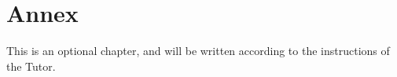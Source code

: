 \chapter*{Annex}
This is an optional chapter, and will be written according to the instructions of the Tutor.









 
